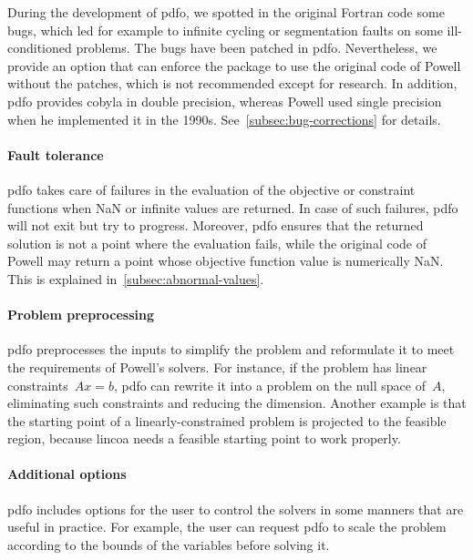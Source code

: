 During the development of \gls{pdfo}, we spotted in the original Fortran code some bugs, which led for example to infinite cycling or segmentation faults on some ill-conditioned problems.
The bugs have been patched in \gls{pdfo}.
Nevertheless, we provide an option that can enforce the package to use the original code of Powell without the patches, which is not recommended except for research.
In addition, \gls{pdfo} provides \gls{cobyla} in double precision, whereas Powell used single precision when he implemented it in the 1990s.
See~\cref{subsec:bug-corrections} for details.

\paragraph{Fault tolerance}

\Gls{pdfo} takes care of failures in the evaluation of the objective or constraint functions when NaN or infinite values are returned.
In case of such failures, \gls{pdfo} will not exit but try to progress.
Moreover, \gls{pdfo} ensures that the returned solution is not a point where the evaluation fails, while the original code of Powell may return a point whose objective function value is numerically NaN.
This is explained in~\cref{subsec:abnormal-values}.

\paragraph{Problem preprocessing}

\gls{pdfo} preprocesses the inputs to simplify the problem and reformulate it to meet the requirements of Powell's solvers.
For instance, if the problem has linear constraints~$A x = b$, \gls{pdfo} can rewrite it into a problem on the null space of~$A$, eliminating such constraints and reducing the dimension.
Another example is that the starting point of a linearly-constrained problem is projected to the feasible region, because \gls{lincoa} needs a feasible starting point to work properly.

\paragraph{Additional options}

\gls{pdfo} includes options for the user to control the solvers in some manners that are useful in practice.
For example, the user can request \gls{pdfo} to scale the problem according to the bounds of the variables before solving it.

